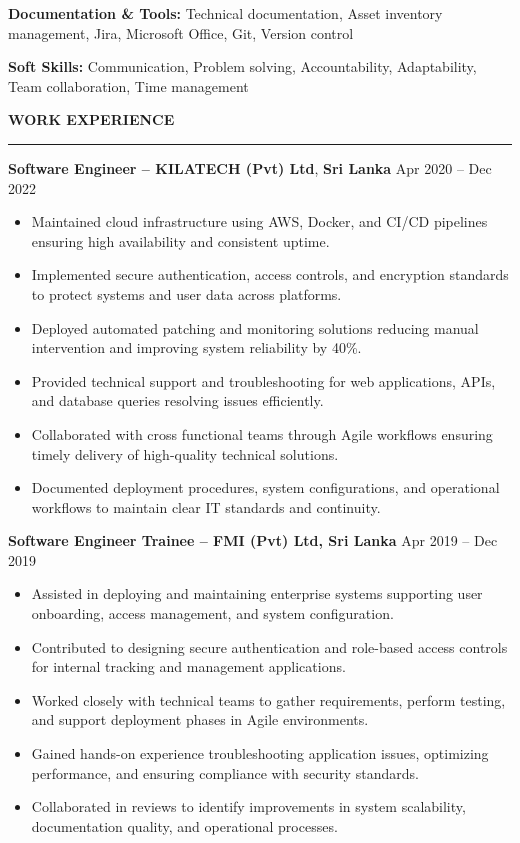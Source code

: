 \documentclass[10pt,letterpaper]{article}
\begin{document}
\textbf{Documentation \& Tools:} Technical documentation, Asset inventory management, Jira, Microsoft Office, Git, Version control

\textbf{Soft Skills:} Communication, Problem solving, Accountability, Adaptability, Team collaboration, Time management

\vspace{8pt}

\textbf{WORK EXPERIENCE}\\[-8pt]
\noindent\rule{\textwidth}{1pt}

\vspace{-2pt}

\textbf{Software Engineer -- KILATECH (Pvt) Ltd}, \textbf{Sri Lanka} \hfill Apr 2020 -- Dec 2022

\vspace{-1pt}

\begin{itemize}
\item Maintained cloud infrastructure using AWS, Docker, and CI/CD pipelines ensuring high availability and consistent uptime.
\item Implemented secure authentication, access controls, and encryption standards to protect systems and user data across platforms.
\item Deployed automated patching and monitoring solutions reducing manual intervention and improving system reliability by 40\%.
\item Provided technical support and troubleshooting for web applications, APIs, and database queries resolving issues efficiently.
\item Collaborated with cross functional teams through Agile workflows ensuring timely delivery of high-quality technical solutions.
\item Documented deployment procedures, system configurations, and operational workflows to maintain clear IT standards and continuity.
\end{itemize}

\textbf{Software Engineer Trainee -- FMI (Pvt) Ltd, Sri Lanka} \hfill Apr 2019 -- Dec 2019

\vspace{-1pt}

\begin{itemize}
\item Assisted in deploying and maintaining enterprise systems supporting user onboarding, access management, and system configuration.
\item Contributed to designing secure authentication and role-based access controls for internal tracking and management applications.
\item Worked closely with technical teams to gather requirements, perform testing, and support deployment phases in Agile environments.
\item Gained hands-on experience troubleshooting application issues, optimizing performance, and ensuring compliance with security standards.
\item Collaborated in reviews to identify improvements in system scalability, documentation quality, and operational processes.
\end{itemize}
\end{document}
